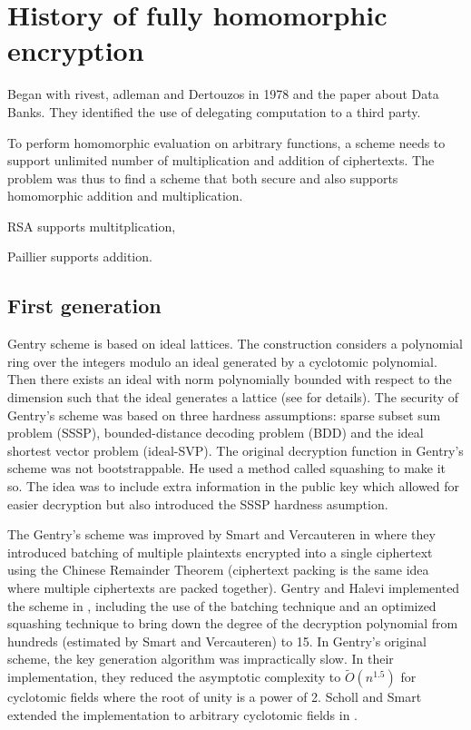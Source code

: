 \chapter{History of fully homomorphic encryption}
Began with rivest, adleman and Dertouzos in 1978 and the paper about Data Banks. 
They identified the use of delegating computation to a third party.

To perform homomorphic evaluation on arbitrary functions, a scheme needs to support unlimited number of multiplication and addition of ciphertexts. The problem was thus to find a scheme that both secure and also supports homomorphic addition and multiplication.

RSA supports multitplication,

Paillier supports addition.

\section{First generation}
Gentry scheme is based on ideal lattices. The construction considers a polynomial ring over the integers modulo an ideal generated by a cyclotomic polynomial. Then there exists an ideal with norm polynomially bounded with respect to the dimension such that the ideal generates a lattice (see \cite{Gentry-Thesis} for details). The security of Gentry's scheme was based on three hardness assumptions: sparse subset sum problem (SSSP), bounded-distance decoding problem (BDD) and the ideal shortest vector problem (ideal-SVP). The original decryption function in Gentry's scheme was not bootstrappable. He used a method called squashing to make it so. The idea was to include extra information in the public key which allowed for easier decryption but also introduced the SSSP hardness asumption.

The Gentry's scheme was improved by Smart and Vercauteren in \cite{SV09-batch} where they introduced batching of multiple plaintexts encrypted into a single ciphertext using the Chinese Remainder Theorem (ciphertext packing is the same idea where multiple ciphertexts are packed together). Gentry and Halevi implemented the scheme in \cite{GS10-impl}, including the use of the batching technique and an optimized squashing technique to bring down the degree of the decryption polynomial from hundreds (estimated by Smart and Vercauteren) to 15. In Gentry's original scheme, the key generation algorithm was impractically slow. In their implementation, they reduced the asymptotic complexity to $\tilde{O}\left(n^{1.5}\right)$ for cyclotomic fields where the root of unity is a power of 2. Scholl and Smart extended the implementation to arbitrary cyclotomic fields in \cite{SS11-keygen}.

